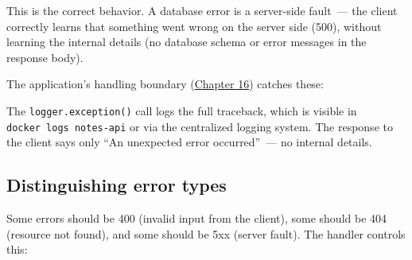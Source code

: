 \noindent{}This is the correct behavior. A database error is a server-side fault~--- the client correctly learns that something went wrong on the server side (500), without learning the internal details (no database schema or error messages in the response body).

The application's handling boundary (\hyperref[ch:16-logging-error-handling]{Chapter 16}) catches these:

\begin{codebox}[short]

\begin{Shaded}
\begin{Highlighting}[]
\NormalTok{(}\NormalTok{)}
\StringTok{ }
    \NormalTok{: }\NormalTok{\}), }
\end{Highlighting}
\end{Shaded}

\end{codebox}

\noindent{}The \texttt{logger.exception()} call logs the full traceback, which is visible in \texttt{docker\ logs\ notes-api} or via the centralized logging system. The response to the client says only ``An unexpected error occurred''~--- no internal details.

\subsection*{Distinguishing error types}\label{33-logic-execution:distinguishing-error-types}

Some errors should be 400 (invalid input from the client), some should be 404 (resource not found), and some should be 5xx (server fault). The handler controls this:


